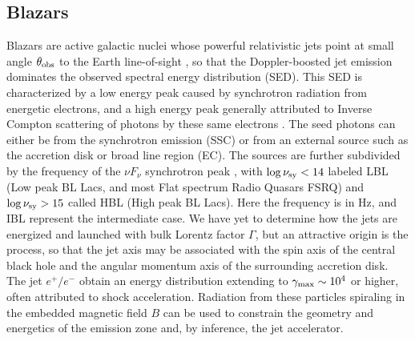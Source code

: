 \subsection{Blazars}
Blazars are active galactic nuclei whose powerful relativistic jets point at small angle $\theta_{\rm obs}$  to the Earth line-of-sight \citep{urry_unified_1995}, so that the Doppler-boosted jet emission dominates the observed spectral energy distribution (SED). This SED is characterized by a low energy peak caused by synchrotron radiation from energetic electrons, and a high energy peak generally attributed to Inverse Compton scattering of photons by these same electrons \citep{maraschi_jet_1992}. The seed photons can either be from the synchrotron emission (SSC) or from an external source such as the accretion disk or broad line region (EC). The sources are further subdivided by the frequency of the $\nu F_\nu$ synchrotron peak \citep{abdo_spectral_2010}, with ${\rm log}\,\nu_{\rm sy} <14$ labeled LBL (Low peak BL Lacs, and most Flat spectrum Radio Quasars FSRQ) and ${\rm log}\,\nu_{\rm sy} > 15$ called HBL (High peak BL Lacs). Here the frequency is in Hz, and IBL represent the intermediate case. We have yet to determine how the jets are energized and launched with bulk Lorentz factor $\Gamma$, but an attractive origin is the \citet{blandford_electromagnetic_1977} process, so that the jet axis may be associated with the spin axis of the central black hole and the angular momentum axis of the surrounding accretion disk. The jet $e^+/e^-$ obtain an energy distribution extending to $\gamma_{\rm max} \sim 10^4$ or higher, often attributed to shock acceleration. Radiation from these particles spiraling in the embedded magnetic field $B$ can be used to constrain the geometry and energetics of the emission zone and, by inference, the jet accelerator.

